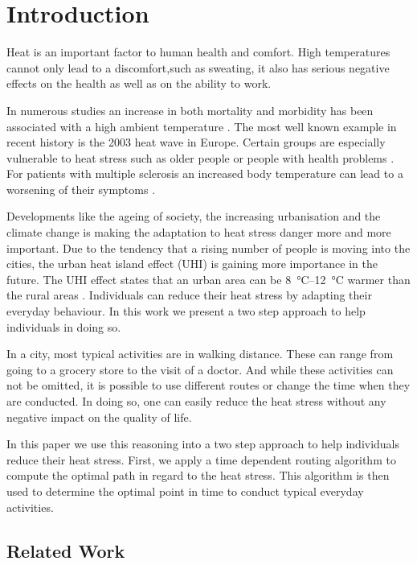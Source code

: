 
\section{Introduction}

Heat is an important factor to human health and comfort. High temperatures cannot only lead to a discomfort,such as sweating, it also has serious negative effects on the health as well as on the ability to work. 

In numerous studies an increase in both mortality and
morbidity has been associated with a high ambient temperature \parencite{Basu2009}. The most well known example in recent history is the 2003 heat wave in Europe. 
Certain groups are especially vulnerable to heat stress such as older people or people with health problems \parencite{Ebi2004,Huebler2007}. For patients with multiple sclerosis an increased body temperature can lead to a worsening of their symptoms \parencite{Davis2010}.

Developments like the ageing of society, the increasing urbanisation and the climate change is making the adaptation to heat stress danger more and more important. Due to the tendency that a rising number of people is moving into the cities, the urban heat island effect (UHI) is gaining more importance in the future. The UHI effect states that an urban area can be  \SIrange{8}{12}{\celsius} warmer than the rural areas \parencite{Prashad2014}. Individuals can reduce their heat stress by adapting their everyday behaviour. In this work we present a two step approach to help individuals in doing so.

In a city, most typical activities are in walking distance. These can range from going to a grocery store to the visit of a doctor. And while these activities can not be omitted, it is possible to use different routes or change the time when they are conducted. In doing so, one can easily reduce the heat stress without any negative impact on the quality of life. 

In this paper we use this reasoning into a two step approach to help individuals reduce their heat stress. First, we apply a time dependent routing algorithm to compute the optimal path in regard to the heat stress. This algorithm is then used to determine the optimal point in time to conduct typical everyday activities. 



   
\subsection{Related Work} 

